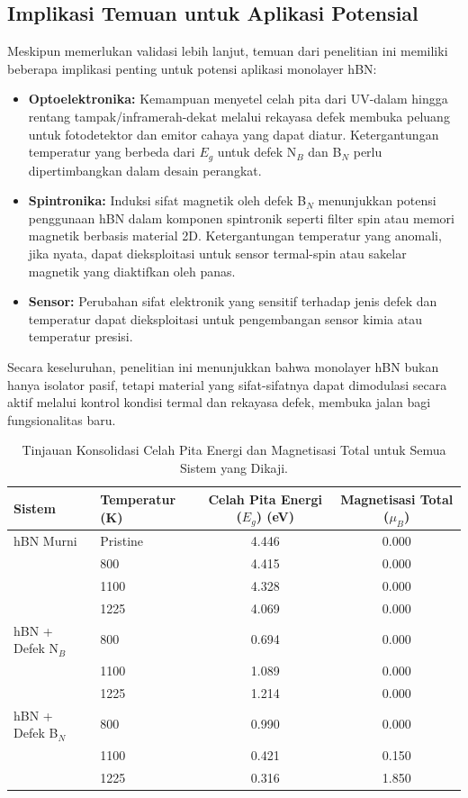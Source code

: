 \subsection{Implikasi Temuan untuk Aplikasi Potensial}
\label{subsec:implikasi_aplikasi}
Meskipun memerlukan validasi lebih lanjut, temuan dari penelitian ini memiliki beberapa implikasi penting untuk potensi aplikasi monolayer hBN:
\begin{itemize}
    \item \textbf{Optoelektronika:} Kemampuan menyetel celah pita dari UV-dalam hingga rentang tampak/inframerah-dekat melalui rekayasa defek membuka peluang untuk fotodetektor dan emitor cahaya yang dapat diatur. Ketergantungan temperatur yang berbeda dari $E_g$ untuk defek N$_B$ dan B$_N$ perlu dipertimbangkan dalam desain perangkat.
    \item \textbf{Spintronika:} Induksi sifat magnetik oleh defek B$_N$ menunjukkan potensi penggunaan hBN dalam komponen spintronik seperti filter spin atau memori magnetik berbasis material 2D. Ketergantungan temperatur yang anomali, jika nyata, dapat dieksploitasi untuk sensor termal-spin atau sakelar magnetik yang diaktifkan oleh panas.
    \item \textbf{Sensor:} Perubahan sifat elektronik yang sensitif terhadap jenis defek dan temperatur dapat dieksploitasi untuk pengembangan sensor kimia atau temperatur presisi.
\end{itemize}
Secara keseluruhan, penelitian ini menunjukkan bahwa monolayer hBN bukan hanya isolator pasif, tetapi material yang sifat-sifatnya dapat dimodulasi secara aktif melalui kontrol kondisi termal dan rekayasa defek, membuka jalan bagi fungsionalitas baru.

\begin{table}[h!]
  \centering
  \caption{Tinjauan Konsolidasi Celah Pita Energi dan Magnetisasi Total untuk Semua Sistem yang Dikaji.}
  \label{tab:konsolidasi_eg_mag}
  \begin{tabular}{llcc}
    \toprule
    Sistem & Temperatur (K) & Celah Pita Energi ($E_g$) (eV) & Magnetisasi Total ($\mu_B$) \\
    \midrule
    hBN Murni & Pristine & 4.446 & 0.000 \\
              & 800      & 4.415 & 0.000 \\
              & 1100     & 4.328 & 0.000 \\
              & 1225     & 4.069 & 0.000 \\
    \midrule
    hBN + Defek N$_B$ & 800  & 0.694 &  0.000 \\
                      & 1100 & 1.089 &  0.000 \\
                      & 1225 & 1.214 &  0.000 \\
    \midrule
    hBN + Defek B$_N$ & 800  & 0.990 &  0.000 \\
                      & 1100 & 0.421 &  0.150 \\
                      & 1225 & 0.316 &  1.850 \\
    \bottomrule
  \end{tabular}
\end{table}